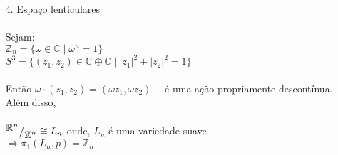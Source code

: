 \begin{ex}
\begin{itemize}
        \item[4.] Espaço lenticulares\\\\
        Sejam:\\
        $\mathbb{Z}_n = \{\omega \in \mathbb{C}\mid \omega^n =1\}$\\
        $S^3 =\{(z_1,z_2)\in \mathbb{C}\oplus\mathbb{C}\mid |z_1|^2 + |z_2|^2 = 1\}$\\\\
        Então $\omega\cdot(z_1,z_2) = (\omega z_1,\omega z_2)$ \ \ é uma ação propriamente descontínua. Além disso,\\\\
        $\mkern-18mu \quad{^{\textstyle \mathbb{R}^n}\big/_{\textstyle \mathbb{Z}^n}} \cong L_n$ onde, $L_n$ é uma variedade suave\\
        
        $\Rightarrow \pi_1(L_n , p) = \mathbb{Z}_n$\\     
        
    \end{itemize} 
\end{ex}
 

